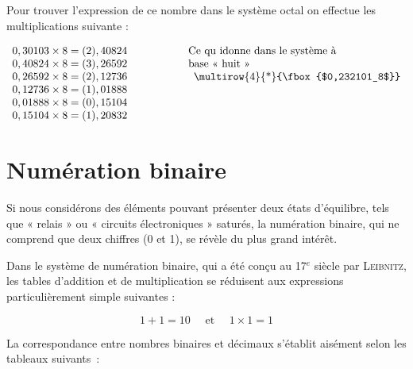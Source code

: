 Pour trouver l'expression de ce nombre dans le système octal on effectue les multiplications suivante : 

\[
\begin{array}{r@{\hspace*{2cm}}l}
0,30103 \times 8 = (2), 40824 & \text{Ce qu idonne dans le système à} \\
0,40824 \times 8 = (3), 26592 & \text{base « huit »} \\
0,26592 \times 8 = (2), 12736 & \multicolumn{1}{c}{$\multirow{4}{*}{\fbox{$0,232101_8$}}$}  \\
0,12736 \times 8 = (1), 01888   \\
0,01888 \times 8 = (0), 15104   \\
0,15104 \times 8 = (1), 20832  \\
\end{array}
\]

\newpage 


\section{Numération binaire}

Si nous considérons des éléments pouvant présenter deux états d'équilibre, tels que « relais » ou « circuits électroniques » saturés, la numération binaire, qui ne comprend que deux chiffres (0 et 1), se révèle du plus grand intérêt.

Dans le système de numération binaire, qui a été conçu au 17$^e$ siècle par \textsc{Leibnitz}, les tables d'addition et de multiplication se réduisent aux expressions particulièrement simple suivantes :

\[ 1 + 1 = 10 \quad \text{ et } \quad 1 \times 1 = 1 \]


La correspondance entre nombres binaires et décimaux s'établit aisément
selon les tableaux suivants~:


